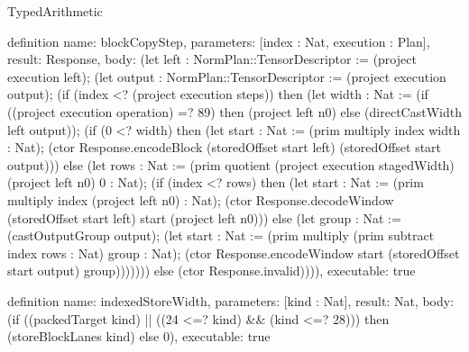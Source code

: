\begin{lexlean}{TypedArithmetic}
\begin{semanticmodule}
definition{
  name: blockCopyStep,
  parameters: [index : Nat, execution : Plan],
  result: Response,
  body: (let left : NormPlan::TensorDescriptor := (project execution left);
    (let output : NormPlan::TensorDescriptor := (project execution output);
    (if (index <? (project execution steps)) then (let width : Nat := (if ((project execution operation) =? 89) then (project left n0) else (directCastWidth left output));
      (if (0 <? width) then (let start : Nat := (prim multiply index width : Nat);
          (ctor Response.encodeBlock (storedOffset start left) (storedOffset start output))) else
        (let rows : Nat := (prim quotient (project execution stagedWidth) (project left n0) 0 : Nat);
        (if (index <? rows) then (let start : Nat := (prim multiply index (project left n0) : Nat);
          (ctor Response.decodeWindow (storedOffset start left) start (project left n0))) else
          (let group : Nat := (castOutputGroup output);
          (let start : Nat := (prim multiply (prim subtract index rows : Nat) group : Nat);
            (ctor Response.encodeWindow start (storedOffset start output) group)))))))
    else (ctor Response.invalid)))),
  executable: true
}

definition{
  name: indexedStoreWidth,
  parameters: [kind : Nat],
  result: Nat,
  body: (if ((packedTarget kind) || ((24 <=? kind) && (kind <=? 28))) then (storeBlockLanes kind) else 0),
  executable: true
}


\end{semanticmodule}
\end{lexlean}
